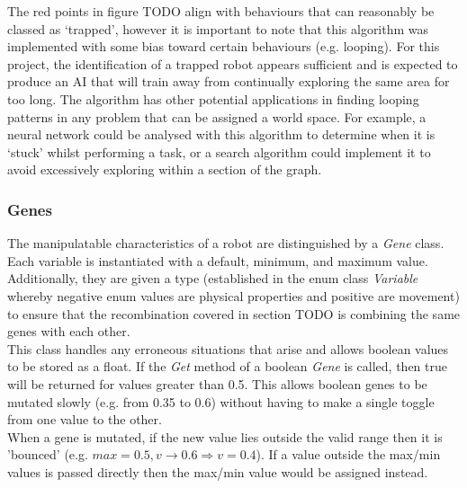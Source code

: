 \documentclass{article}
\begin{document}
The red points in figure TODO align with behaviours that can reasonably be classed as ‘trapped’, however it is important to note that this algorithm was implemented with some bias toward certain behaviours (e.g. looping). For this project, the identification of a trapped robot appears sufficient and is expected to produce an AI that will train away from continually exploring the same area for too long. The algorithm has other potential applications in finding looping patterns in any problem that can be assigned a world space. For example, a neural network could be analysed with this algorithm to determine when it is ‘stuck’ whilst performing a task, or a search algorithm could implement it to avoid excessively exploring within a section of the graph. 


\subsubsection{Genes}
The manipulatable characteristics of a robot are distinguished by a \textit{Gene} class. Each variable is instantiated with a default, minimum, and maximum value. Additionally, they are given a type (established in the enum class \textit{Variable} whereby negative enum values are physical properties and positive are movement) to ensure that the recombination covered in section TODO is combining the same genes with each other. \\
This class handles any erroneous situations that arise and allows boolean values to be stored as a float. If the \textit{Get} method of a boolean \textit{Gene} is called, then true will be returned for values greater than 0.5. This allows boolean genes to be mutated slowly (e.g. from 0.35 to 0.6) without having to make a single toggle from one value to the other. \\
When a gene is mutated, if the new value lies outside the valid range then it is 'bounced' (e.g. $max=0.5, v\rightarrow0.6 \Rightarrow v=0.4$). If a value outside the max/min values is passed directly then the max/min value would be assigned instead.
\end{document}
